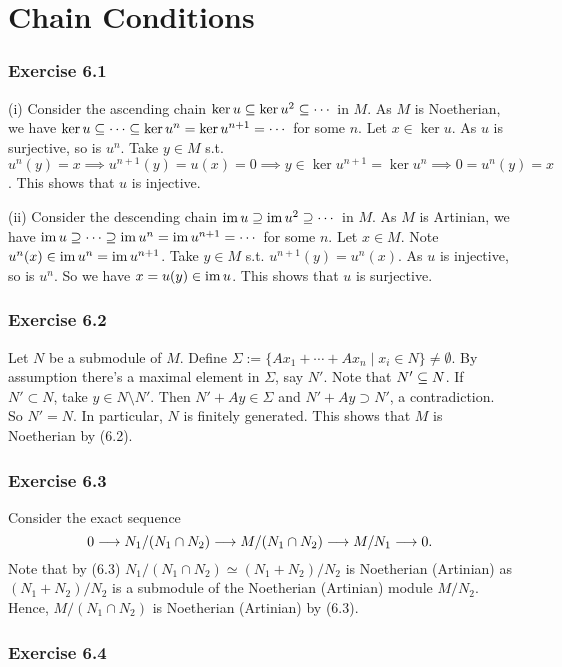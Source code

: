 \documentclass[../A&M.tex]{subfiles}
\begin{document}
\chapter{Chain Conditions}

\subsection*{Exercise 6.1}

(i) Consider the ascending chain $\ker u \subseteq \ker u^2 \subseteq \cdots$ in $M$. As $M$ is Noetherian, we have $\ker u \subseteq \cdots \subseteq \ker u^n = \ker u^{n+1} = \cdots$ for some $n$. Let $x\in\ker u$. As $u$ is surjective, so is $u^n$. Take $y\in M$ s.t. $u^n(y)=x \implies u^{n+1}(y) = u(x) = 0 \implies y \in\ker u^{n+1} = \ker u^n \implies 0 = u^n(y) = x$. This shows that $u$ is injective.

(ii) Consider the descending chain $\operatorname{im} u \supseteq \operatorname{im} u^2 \supseteq \cdots$ in $M$. As $M$ is Artinian, we have $\operatorname{im} u \supseteq \cdots \supseteq \operatorname{im} u^n = \operatorname{im} u^{n+1} = \cdots$ for some $n$. Let $x\in M$. Note $u^n(x) \in \operatorname{im} u^n = \operatorname{im} u^{n+1}$. Take $y\in M$ s.t. $u^{n+1}(y) = u^n(x)$. As $u$ is injective, so is $u^n$. So we have $x = u(y) \in\operatorname{im} u$. This shows that $u$ is surjective.

\subsection*{Exercise 6.2}

Let $N$ be a submodule of $M$. Define $\Sigma := \{ Ax_1+\cdots+Ax_n \mid x_i \in N \} \neq \emptyset$. By assumption there's a maximal element in $\Sigma$, say $N'$. Note that $N' \subseteq N$. If $N'\subset N$, take $y \in N \setminus N'$. Then $N'+Ay \in \Sigma$ and $N'+Ay \supset N'$, a contradiction. So $N' = N$. In particular, $N$ is finitely generated. This shows that $M$ is Noetherian by (6.2).

\subsection*{Exercise 6.3}

Consider the exact sequence
$$
0 \longrightarrow N_1/(N_1\cap N_2) \longrightarrow M/(N_1\cap N_2) \longrightarrow M/N_1 \longrightarrow 0.
$$
Note that by (6.3) $N_1/(N_1\cap N_2) \simeq (N_1+N_2)/N_2$ is Noetherian (Artinian) as $(N_1+N_2)/N_2$ is a submodule of the Noetherian (Artinian) module $M/N_2$. Hence, $M/(N_1\cap N_2)$ is Noetherian (Artinian) by (6.3). 

\subsection*{Exercise 6.4}
\end{document}
